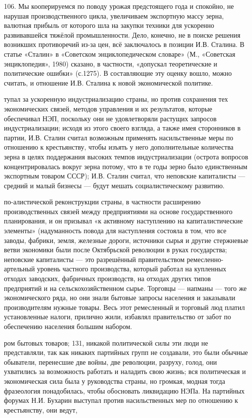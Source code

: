 106. Мы кооперируемся по поводу урожая предстоящего года и спокойно, не нарушая производственного цикла, увеличиваем экспортную массу зерна, валютная прибыль от которого шла на закупки техники для ускоренно развивавшейся тяжёлой промышленности. Дело, конечно, не в поиске решения возникших противоречий из-за цен, всё заключалось в позиции И.В. Сталина. В статье «Сталин» в «Советском энциклопедическом словаре» (М., «Советская энциклопедия», 1980) сказано, в частности, «допускал теоретические и политические ошибки» (с.1275). В составляющие эту оценку вошло, можно считать, и отношение И.В. Сталина к новой экономической политике.

тупал за ускоренную индустриализацию страны, но против сохранения тех экономических связей, методов управления и их результатов, которые обеспечивал НЭП, поскольку они не удовлетворяли растущих запросов индустриализации; исходя из этого своего взгляда, а также имея сторонников в партии, И.В. Сталин считал возможным применять насильственные меры по отношению к крестьянству, чтобы изъять у него дополнительные количества зерна в целях поддержания высоких темпов индустриализации (острота вопросов концентрировалась вокруг зерна потому, что в те годы зерно было единственным экспортным товаром СССР); И.В. Сталин считал, что неповские капиталисты — средний и малый бизнесы — будут мешать социалистическому развитию.

по-алистической реконструкции страны, в частности расширению производственных связей между предприятиями на основе государственного планирования, и он призывал «к активному наступлению на капиталистические элементы» (надуманность повода для наступления состояла в том, что все заводы, фабрики, земля, железные дороги, источники сырья и другие стержневые ветви экономики были после Октябрьской революции в руках государства; неповские капиталисты — это разрешённый правительством ремесленно-артельный уровень частного производства, который работал на купленных отходах заводских, фабричных производств, на отходах других типов предприятий и на сельскохозяйственном сырье. Торговцы — напманы — того же экономического ряда, но они знали бытовые запросы населения и заказывали производителям нужные товары. Весь этот ремесленный и торговый люд платил установленные налоги, прилично жили, избавлял правительство от забот по обеспечению населения большим набором.

ром бытовых товаров; 131, никакой политической силы эти люди не представляли, так как никаких партийных групп не создавали, это были обычные обыватели, перенесшие две войны, две революции, разруху, голод, они ухватились за возможность работать и наладить свою жизнь; вся политическая и экономическая сила была у руководства страны, но громкая, модная тогда фразеология понадобилась, чтобы обосновать ликвидацию НЭПа. На партийных форумах Н.И. Бухарин выступал против насильственных мер по отношению к крестьянству, они ведут,

